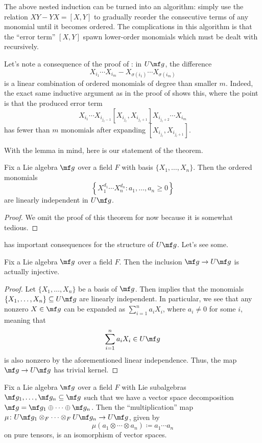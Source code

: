 \documentclass[../notes.tex]{subfiles}
\begin{document}
\begin{remark}
	The above nested induction can be turned into an algorithm: simply use the relation $XY-YX=[X,Y]$ to gradually reorder the consecutive terms of any monomial until it becomes ordered. The complications in this algorithm is that the ``error term'' $[X,Y]$ spawn lower-order monomials which must be dealt with recursively.
\end{remark}
\begin{remark} \label{rem:spit-error-term}
	Let's note a consequence of the proof of : in $U\mf g$, the difference
	\[X_{i_1}\cdots X_{i_m}-X_{\sigma(i_1)}\cdots X_{\sigma(i_m)}\]
	is a linear combination of ordered monomials of degree than smaller $m$. Indeed, the exact same inductive argument as in the proof of  shows this, where the point is that the produced error term
	\[X_{i_1}\cdots X_{i_{j_\ell-1}}[X_{i_{j_\ell}},X_{i_{j_\ell+1}}]X_{i_{j_\ell+2}}\cdots X_{i_m}\]
	has fewer than $m$ monomials after expanding $[X_{i_{j_\ell}},X_{i_{j_\ell+1}}]$.
\end{remark}
With the lemma in mind, here is our statement of the theorem.
\begin{theorem} \label{thm:pbw}
	Fix a Lie algebra $\mf g$ over a field $F$ with basis $\{X_1,\ldots,X_n\}$. Then the ordered monomials
	\[\left\{X_1^{d_1}\cdots X_n^{d_n}:a_1,\ldots,a_n\ge0\right\}\]
	are linearly independent in $U\mf g$.
\end{theorem}
\begin{proof}
	We omit the proof of this theorem for now because it is somewhat tedious.\todo{}
\end{proof}
 has important consequences for the structure of $U\mf g$. Let's see some.
\begin{corollary}
	Fix a Lie algebra $\mf g$ over a field $F$. Then the inclusion $\mf g\to U\mf g$ is actually injective.
\end{corollary}
\begin{proof}
	Let $\{X_1,\ldots,X_n\}$ be a basis of $\mf g$. Then  implies that the monomials $\{X_1,\ldots,X_n\}\subseteq U\mf g$ are linearly independent. In particular, we see that any nonzero $X\in\mf g$ can be expanded as $\sum_{i=1}^na_iX_i$, where $a_i\ne0$ for some $i$, meaning that
	\[\sum_{i=1}^na_iX_i\in U\mf g\]
	is also nonzero by the aforementioned linear independence. Thus, the map $\mf g\to U\mf g$ has trivial kernel.
\end{proof}
\begin{corollary}
	Fix a Lie algebra $\mf g$ over a field $F$ with Lie subalgebras $\mf g_1,\ldots,\mf g_n\subseteq\mf g$ such that we have a vector space decomposition $\mf g=\mf g_1\oplus\cdots\oplus\mf g_n$. Then the ``multiplication'' map $\mu\colon U\mf g_1\otimes_F\cdots\otimes_F U\mf g_n\to U\mf g$, given by
	\[\mu(a_1\otimes\cdots\otimes a_n)\coloneqq a_1\cdots a_n\]
	on pure tensors, is an isomorphism of vector spaces.
\end{corollary}
\end{document}

